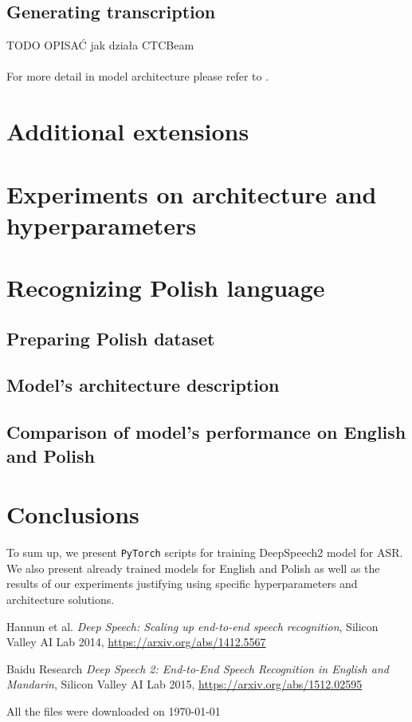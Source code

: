\documentclass[licencjacka,en]{pracamgr}
\newcommand{\bibDownloadDate}{\today}
\begin{document}
\section{Generating transcription}
TODO OPISAĆ jak działa CTCBeam \\\\
For more detail in model architecture please refer to \cite{DS2}.


\chapter{Additional extensions}\label{r:extens}


\chapter{Experiments on architecture and hyperparameters}\label{r:hypers}


\chapter{Recognizing Polish language}\label{r:polish}

\section{Preparing Polish dataset}
\section{Model’s architecture description}
\section{Comparison of model's performance on English and Polish}


\chapter{Conclusions}\label{r:concls}

To sum up, we present \texttt{PyTorch} scripts for training DeepSpeech2 model for ASR. We also present already trained models for English and Polish as well as the results of our experiments justifying using specific hyperparameters and architecture solutions.\\

\begin{thebibliography}{99}

 Hannun et al. 
\textit{Deep Speech: Scaling up end-to-end speech recognition}, Silicon Valley AI Lab 2014, \href{https://arxiv.org/abs/1412.5567}{https://arxiv.org/abs/1412.5567}
  
 Baidu Research \textit{ Deep Speech 2: End-to-End Speech Recognition in English and Mandarin}, Silicon Valley AI Lab 2015, \href{https://arxiv.org/abs/1512.02595}{https://arxiv.org/abs/1512.02595}
  
\end{thebibliography}
All the files were downloaded on \bibDownloadDate
\end{document}
